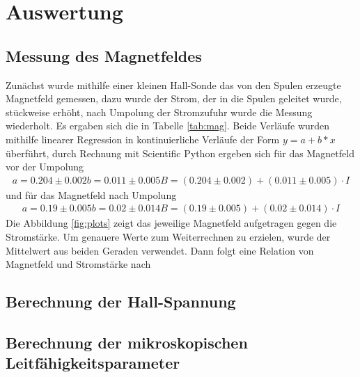 \section{Auswertung}
\label{sec:Auswertung}

\subsection{Messung des Magnetfeldes}
Zunächst wurde mithilfe einer kleinen Hall-Sonde das von den Spulen erzeugte Magnetfeld gemessen, dazu wurde der Strom, der in die Spulen geleitet wurde, stückweise erhöht, 
nach Umpolung der Stromzufuhr wurde die Messung wiederholt. Es ergaben sich die in Tabelle \ref{tab:mag}.
% 
Beide Verläufe wurden mithilfe linearer Regression in kontinuierliche Verläufe der Form $y = a + b*x$ überführt, durch Rechnung mit Scientific Python ergeben sich für das 
Magnetfeld vor der Umpolung
\begin{align*}
a = 0.204 \pm 0.002
b = 0.011 \pm 0.005
B = (0.204 \pm 0.002) + (0.011 \pm 0.005) \cdot I
\end{align*}
und für das Magnetfeld nach Umpolung
\begin{align*}
a = 0.19 \pm 0.005
b = 0.02 \pm 0.014
B = (0.19 \pm 0.005) + (0.02 \pm 0.014) \cdot I
\end{align*}
Die Abbildung \ref{fig:plots} zeigt das jeweilige Magnetfeld aufgetragen gegen die Stromstärke. 
Um genauere Werte zum Weiterrechnen zu erzielen, wurde der Mittelwert aus
beiden Geraden verwendet. Dann folgt eine Relation von Magnetfeld und Stromstärke nach
%

\subsection{Berechnung der Hall-Spannung}

\subsection{Berechnung der mikroskopischen Leitfähigkeitsparameter}